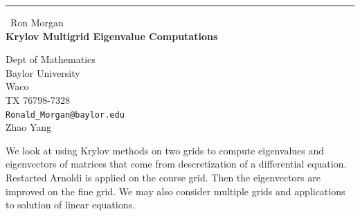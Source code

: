 \documentclass{report}
\begin{document}
\begin{center}
\rule{6in}{1pt} \
{\large Ron Morgan \\
{\bf Krylov Multigrid Eigenvalue Computations }}

Dept of Mathematics \\ Baylor University \\ Waco \\ TX 76798-7328
\\
{\tt Ronald\_Morgan@baylor.edu}\\
Zhao Yang\end{center}

We look at using Krylov methods on two grids to compute eigenvalues and
eigenvectors of matrices that come from descretization of a differential
equation. Restarted Arnoldi is applied on the course grid. Then the
eigenvectors are improved on the fine grid. We may also consider multiple
grids and applications to solution of linear equations.
\end{document}
